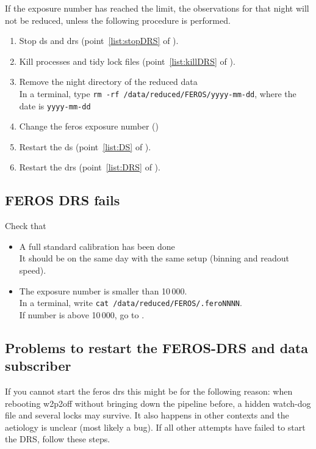 \documentclass[11pt,fleqn,a4paper]{book}
\begin{document}
If the exposure number has reached the limit, the observations for that night will not be reduced, unless the following procedure is performed.

\label{proc:FEROSfix10000}
\begin{enumerate}
    \item Stop \gls{ds} and \gls{drs} (point~\ref{list:stopDRS} of ).
    \item Kill processes and tidy lock files (point~\ref{list:killDRS} of ).
    \item Remove the night directory of the reduced data\\
          In a terminal, type \texttt{rm -rf /data/reduced/FEROS/yyyy-mm-dd},
          where the date is \texttt{yyyy-mm-dd}
    \item Change the \gls{feros} exposure number ()
    \item Restart the \gls{ds} (point~\ref{list:DS} of ).
    \item Restart the \gls{drs} (point~\ref{list:DRS} of ).
\end{enumerate}


\subsection{FEROS DRS fails}

Check that
\begin{itemize}
    \item A full standard calibration has been done\\
          It should be on the same day with the same setup (binning and readout speed).
    \item The exposure number is smaller than 10\,000.\\
          In a terminal, write \texttt{cat /data/reduced/FEROS/.feroNNNN}.\\
          If number is above 10\,000, go to .
\end{itemize}

\subsection{Problems to restart the FEROS-DRS and data subscriber}


If you cannot start the \gls{feros} \gls{drs} this might be for the following reason: when rebooting \gls{w2p2off} without bringing down the pipeline before, a hidden watch-dog file and several locks may survive.  It also happens in other contexts and the aetiology is unclear (most likely a bug). If all other attempts have failed to start the DRS, follow these steps.
\end{document}
